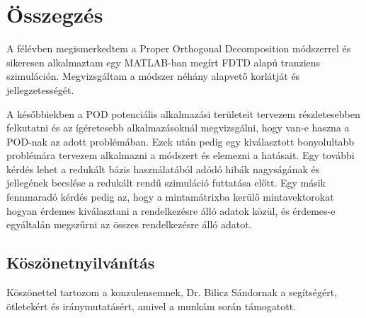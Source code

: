     \section{Összegzés}
        A félévben megismerkedtem a Proper Orthogonal Decomposition módszerrel és sikeresen alkalmaztam egy MATLAB-ban megírt FDTD alapú tranziens szimuláción. Megvizsgáltam a módszer néhány alapvető korlátját és jellegzetességét.
        \par
        A későbbiekben a POD potenciális alkalmazási területeit tervezem részletesebben felkutatni és az ígéretesebb alkalmazásoknál megvizsgálni, hogy van-e haszna a POD-nak az adott problémában. Ezek után pedig egy kiválasztott bonyolultabb problémára tervezem alkalmazni a módszert és elemezni a hatásait. Egy további kérdés lehet a redukált bázis használatából adódó hibák nagyságának és jellegének becslése a redukált rendű szimuláció futtatása előtt. Egy másik fennmaradó kérdés pedig az, hogy a mintamátrixba kerülő mintavektorokat hogyan érdemes kiválasztani a rendelkezésre álló adatok közül, és érdemes-e egyáltalán megszűrni az összes rendelkezésre álló adatot.
        \subsection*{Köszönetnyilvánítás}
            Köszönettel tartozom a konzulensemnek, Dr. Bilicz Sándornak a segítségért, ötletekért és iránymutatásért, amivel a munkám során támogatott.
    
    




